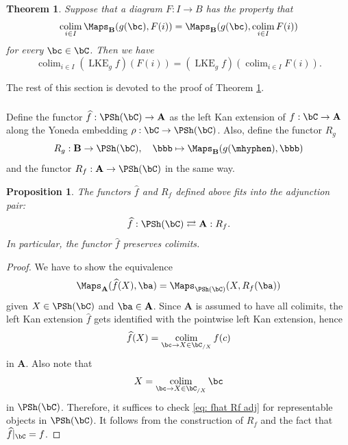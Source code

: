 \documentclass[10pt]{amsart}
\newcommand{\sssec}{\subsubsection}
\newtheorem{thm}[subsubsection]{Theorem}
\newtheorem{prop}[subsubsection]{Proposition}
\theoremstyle{remark}
\newcommand{\wh}{\widehat}
\newcommand{\on}{\operatorname}
\DeclareMathOperator{\colim}{colim}
\newcommand{\bA}{\mathbf{A}}
\newcommand{\bB}{\mathbf{B}}
\begin{document}
\begin{thm}\label{thm: LKE and colimits}
    Suppose that a diagram $F:I\rightarrow B$ has the property that
    \begin{equation}\label{eq: assumption for LKE lemma}
        \colim_{i\in I} \Maps_{\bB}(g(\bc),F(i))=\Maps_{\bB}(g(\bc),\colim_{i\in I}F(i))
    \end{equation}
    for every $\bc\in \bC$. Then we have
    \[\colim_{i\in I}(\on{LKE}_g f)(F(i))=(\on{LKE}_g f)(\colim_{i\in I}F(i)).
    \]
\end{thm}

The rest of this section is devoted to the proof of Theorem \ref{thm: LKE and colimits}.

\sssec{} Define the functor $\wh{f}:\PSh(\bC)\rightarrow \bA$ as the left Kan extension of $f:\bC\rightarrow \bA$ along the Yoneda embedding $\rho: \bC\rightarrow\PSh(\bC)$. Also, define the functor $R_g$
\[R_g:\bB\rightarrow\PSh(\bC),\quad \bbb\mapsto \Maps_{\bB}(g(\mhyphen),\bbb)\]
and the functor $R_f: \bA\rightarrow\PSh(\bC)$ in the same way.

\begin{prop}\label{prop: whf and Rf}
    The functors $\wh{f}$ and $R_f$ defined above fits into the adjunction pair:
    \[\wh{f}:\PSh(\bC)\rightleftarrows \bA:R_f.\]
    In particular, the functor $\wh{f}$ preserves colimits.
\end{prop}
\begin{proof}
    We have to show the equivalence
    \begin{equation}\label{eq: fhat Rf adj}
        \Maps_{\bA}(\wh{f}(X), \ba)=\Maps_{\PSh(\bC)}(X,R_f(\ba))
    \end{equation}
    given $X\in\PSh(\bC)$ and $\ba\in\bA$.
    Since $\bA$ is assumed to have all colimits, the left Kan extension $\wh{f}$ gets identified with the pointwise left Kan extension, hence
    \[\wh{f}(X)=\colim_{\bc\rightarrow X\in \bC_{/X}} f(c)\]
    in $\bA$.
    Also note that 
    \[X=\colim_{\bc\rightarrow X\in \bC_{/X}}\bc\]
    in $\PSh(\bC)$.
    Therefore, it suffices to check \eqref{eq: fhat Rf adj} for representable objects in $\PSh(\bC)$. It follows from the construction of  $R_f$ and the fact that $\wh{f}|_{\bC}=f$.    
\end{proof}
\end{document}
